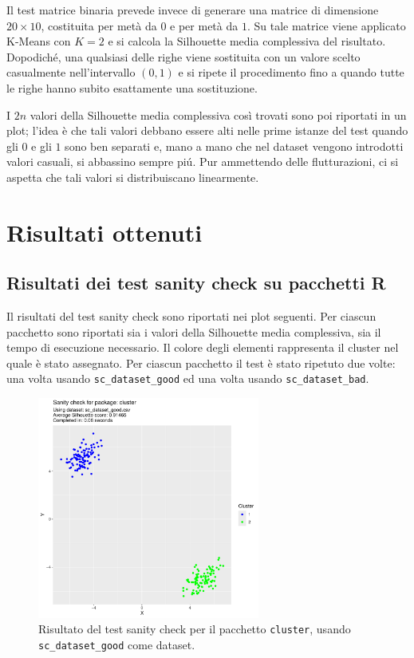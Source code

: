 \documentclass[a4paper, 12pt]{report}
\begin{document}
			Il test matrice binaria prevede invece di generare una matrice
			di dimensione $20 \times 10$, costituita per metà da $0$ e per
			metà da $1$. Su tale matrice viene applicato K-Means con $K = 2$
			e si calcola la Silhouette media complessiva del risultato.
			Dopodiché, una qualsiasi delle righe viene sostituita con un
			valore scelto casualmente nell'intervallo $(0, 1)$ e si
			ripete il procedimento fino a quando tutte le righe hanno
			subito esattamente una sostituzione.

			I $2n$ valori della Silhouette media complessiva così trovati
			sono poi riportati in un plot; l'idea è che tali valori debbano
			essere alti nelle prime istanze del test quando gli $0$ e gli
			$1$ sono ben separati e, mano a mano che nel dataset vengono
			introdotti valori casuali, si abbassino sempre piú. Pur
			ammettendo delle flutturazioni, ci si aspetta che tali
			valori si distribuiscano linearmente.

	\chapter{Risultati ottenuti}

		\section{Risultati dei test sanity check su pacchetti R}

			Il risultati del test sanity check sono riportati nei plot
			seguenti. Per ciascun pacchetto sono riportati sia i valori
			della Silhouette media complessiva, sia il tempo di esecuzione
			necessario. Il colore degli elementi rappresenta il cluster
			nel quale è stato assegnato. Per ciascun pacchetto il test
			è stato ripetuto due volte: una volta usando \texttt{sc\_dataset\_good}
			ed una volta usando \texttt{sc\_dataset\_bad}.

			\begin{figure}[H]
				\centering
				\includegraphics[width = 0.65\textwidth, page = 1]{results/results_CLUSTER.pdf}
				\caption{Risultato del test sanity check per il pacchetto \texttt{cluster}, usando \texttt{sc\_dataset\_good} come dataset.}
				\label{fig:clustergood}
			\end{figure}
\end{document}
